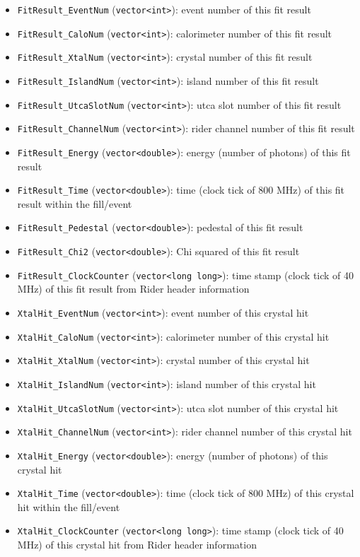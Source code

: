 \documentclass[12pt,letterpaper]{article}
\begin{document}
\begin{itemize}

\item \verb+FitResult_EventNum+ (\verb+vector<int>+): event number of this fit result
\item \verb+FitResult_CaloNum+ (\verb+vector<int>+): calorimeter number of this fit result
\item \verb+FitResult_XtalNum+ (\verb+vector<int>+): crystal number of this fit result
\item \verb+FitResult_IslandNum+ (\verb+vector<int>+): island number of this fit result
\item \verb+FitResult_UtcaSlotNum+ (\verb+vector<int>+): utca slot number of this fit result
\item \verb+FitResult_ChannelNum+ (\verb+vector<int>+): rider channel number of this fit result
\item \verb+FitResult_Energy+ (\verb+vector<double>+): energy (number of photons) of this fit result
\item \verb+FitResult_Time+ (\verb+vector<double>+): time (clock tick of 800 MHz) of this fit result within the fill/event
\item \verb+FitResult_Pedestal+ (\verb+vector<double>+): pedestal of this fit result
\item \verb+FitResult_Chi2+ (\verb+vector<double>+): Chi squared of this fit result
\item \verb+FitResult_ClockCounter+ (\verb+vector<long long>+): time stamp (clock tick of 40 MHz) of this fit result from Rider header information

\item \verb+XtalHit_EventNum+ (\verb+vector<int>+): event number of this crystal hit
\item \verb+XtalHit_CaloNum+ (\verb+vector<int>+): calorimeter number of this crystal hit
\item \verb+XtalHit_XtalNum+ (\verb+vector<int>+): crystal number of this crystal hit
\item \verb+XtalHit_IslandNum+ (\verb+vector<int>+): island number of this crystal hit
\item \verb+XtalHit_UtcaSlotNum+ (\verb+vector<int>+): utca slot number of this crystal hit
\item \verb+XtalHit_ChannelNum+ (\verb+vector<int>+): rider channel number of this crystal hit
\item \verb+XtalHit_Energy+ (\verb+vector<double>+): energy (number of photons) of this crystal hit
\item \verb+XtalHit_Time+ (\verb+vector<double>+): time (clock tick of 800 MHz) of this crystal hit within the fill/event
\item \verb+XtalHit_ClockCounter+ (\verb+vector<long long>+): time stamp (clock tick of 40 MHz) of this crystal hit from Rider header information


\end{itemize}
\end{document}
